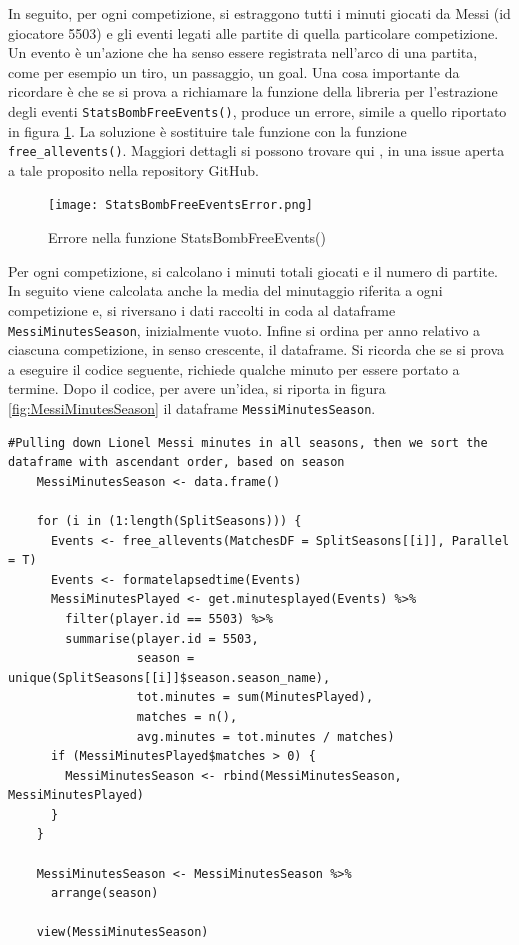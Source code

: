             In seguito, per ogni competizione, si estraggono tutti i minuti giocati da Messi (id giocatore 5503) e gli eventi legati alle partite di quella particolare competizione. Un evento è un'azione che ha senso essere registrata nell'arco di una partita, come per esempio un tiro, un passaggio, un goal. Una cosa importante da ricordare è che se si prova a richiamare la funzione della libreria per l'estrazione degli eventi \texttt{StatsBombFreeEvents()}, produce un errore, simile a quello riportato in figura \ref{fig:StatsBombFreeevents}. La soluzione è sostituire tale funzione con la funzione \texttt{free\_allevents()}. Maggiori dettagli si possono trovare qui \cite{StatsBombFreeEventsError}, in una issue aperta a tale proposito nella repository GitHub.

            \begin{figure}[h]
                \texttt{[image: StatsBombFreeEventsError.png]}
                \centering
                \caption{Errore nella funzione StatsBombFreeEvents()}
                \label{fig:StatsBombFreeevents}
            \end{figure}
            
            Per ogni competizione, si calcolano i minuti totali giocati e il numero di partite. In seguito viene calcolata anche la media del minutaggio riferita a ogni competizione e, si riversano i dati raccolti in coda al dataframe \texttt{MessiMinutesSeason}, inizialmente vuoto. Infine si ordina per anno relativo a ciascuna competizione, in senso crescente, il dataframe. Si ricorda che se si prova a eseguire il codice seguente, richiede qualche minuto per essere portato a termine. Dopo il codice, per avere un'idea, si riporta in figura \ref{fig:MessiMinutesSeason} il dataframe \texttt{MessiMinutesSeason}.

            \vspace{5pt}

            \begin{lstlisting}[numbers=None]
    #Pulling down Lionel Messi minutes in all seasons, then we sort the dataframe with ascendant order, based on season
    MessiMinutesSeason <- data.frame()
    
    for (i in (1:length(SplitSeasons))) {
      Events <- free_allevents(MatchesDF = SplitSeasons[[i]], Parallel = T)
      Events <- formatelapsedtime(Events)
      MessiMinutesPlayed <- get.minutesplayed(Events) %>%
        filter(player.id == 5503) %>%
        summarise(player.id = 5503,
                  season = unique(SplitSeasons[[i]]$season.season_name),
                  tot.minutes = sum(MinutesPlayed),
                  matches = n(),
                  avg.minutes = tot.minutes / matches)
      if (MessiMinutesPlayed$matches > 0) {
        MessiMinutesSeason <- rbind(MessiMinutesSeason, MessiMinutesPlayed)
      }
    }
    
    MessiMinutesSeason <- MessiMinutesSeason %>%
      arrange(season)
    
    view(MessiMinutesSeason)
            \end{lstlisting}

